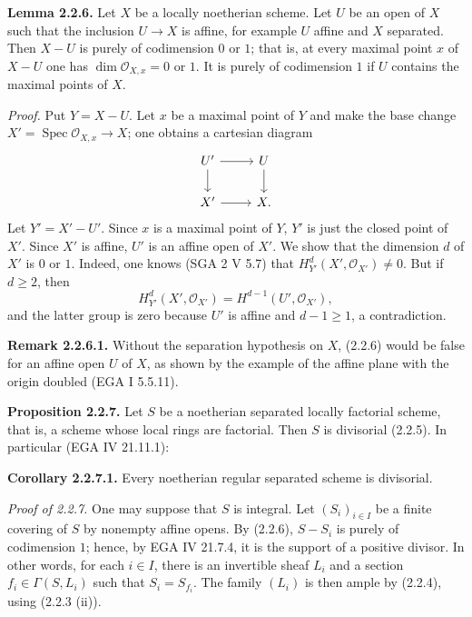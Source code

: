 \textbf{Lemma 2.2.6.} Let $X$ be a locally noetherian scheme. Let $U$ be an open of $X$ such that the inclusion $U\to X$ is affine, for example $U$ affine and $X$ separated. Then $X-U$ is purely of codimension $0$ or $1$; that is, at every maximal point $x$ of $X-U$ one has $\dim\mathcal O_{X,x}=0$ or $1$. It is purely of codimension $1$ if $U$ contains the maximal points of $X$.

\emph{Proof.} Put $Y=X-U$. Let $x$ be a maximal point of $Y$ and make the base change $X'=\operatorname{Spec}\mathcal O_{X,x}\to X$; one obtains a cartesian diagram
\[
\begin{tikzcd}
U' \arrow[r] \arrow[d] & U \arrow[d] \\
X' \arrow[r] & X .
\end{tikzcd}
\]
Let $Y'=X'-U'$. Since $x$ is a maximal point of $Y$, $Y'$ is just the closed point of $X'$. Since $X'$ is affine, $U'$ is an affine open of $X'$. We show that the dimension $d$ of $X'$ is $0$ or $1$. Indeed, one knows (SGA 2 V 5.7) that $H^d_{Y'}(X',\mathcal O_{X'})\ne0$. But if $d\ge2$, then
\[
H^d_{Y'}(X',\mathcal O_{X'})=H^{d-1}(U',\mathcal O_{X'}),
\]
and the latter group is zero because $U'$ is affine and $d-1\ge1$, a contradiction.

\textbf{Remark 2.2.6.1.} Without the separation hypothesis on $X$, (2.2.6) would be false for an affine open $U$ of $X$, as shown by the example of the affine plane with the origin doubled (EGA I 5.5.11).

\textbf{Proposition 2.2.7.} Let $S$ be a noetherian separated locally factorial scheme, that is, a scheme whose local rings are factorial. Then $S$ is divisorial (2.2.5). In particular (EGA IV 21.11.1):

\textbf{Corollary 2.2.7.1.} Every noetherian regular separated scheme is divisorial.

\emph{Proof of 2.2.7.} One may suppose that $S$ is integral. Let $(S_i)_{i\in I}$ be a finite covering of $S$ by nonempty affine opens. By (2.2.6), $S-S_i$ is purely of codimension $1$; hence, by EGA IV 21.7.4, it is the support of a positive divisor. In other words, for each $i\in I$, there is an invertible sheaf $L_i$ and a section $f_i\in\Gamma(S,L_i)$ such that $S_i=S_{f_i}$. The family $(L_i)$ is then ample by (2.2.4), using (2.2.3 (ii)).

